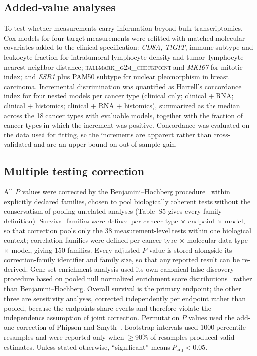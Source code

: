 \subsection{Added-value analyses}
\label{sec:methods:addedvalue}

To test whether measurements carry information beyond bulk transcriptomics, Cox
models for four target measurements were refitted with matched molecular
covariates added to the clinical specification: \textit{CD8A}, \textit{TIGIT},
immune subtype and leukocyte fraction for intratumoral lymphocyte density and
tumor--lymphocyte nearest-neighbor distance;
\textsc{hallmark\_g2m\_checkpoint} and \textit{MKI67} for mitotic index; and
\textit{ESR1} plus PAM50 subtype for nuclear pleomorphism in breast carcinoma.
Incremental discrimination was quantified as Harrell's concordance index for four
nested models per cancer type (clinical only; clinical + RNA; clinical +
histomics; clinical + RNA + histomics), summarized as the median across the 18
cancer types with evaluable models, together with the fraction of cancer types in
which the increment was positive. Concordance was evaluated on the data used for
fitting, so the increments are apparent rather than cross-validated and are an
upper bound on out-of-sample gain.

\subsection{Multiple testing correction}
\label{sec:methods:multiple}

All $P$ values were corrected by the Benjamini--Hochberg
procedure~\cite{benjamini1995} within explicitly declared families, chosen to
pool biologically coherent tests without the conservatism of pooling unrelated
analyses (Table~S5 gives every family definition). Survival
families were defined per cancer type $\times$ endpoint $\times$ model, so that
correction pools only the 38 measurement-level tests within one biological
context; correlation families were defined per cancer type $\times$ molecular
data type $\times$ model, giving 150 families. Every adjusted $P$ value is stored
alongside its correction-family identifier and family size, so that any reported
result can be re-derived. Gene set enrichment analysis used its own canonical
false-discovery procedure based on pooled null normalized enrichment score
distributions~\cite{subramanian2005} rather than Benjamini--Hochberg. Overall
survival is the primary endpoint; the other three are sensitivity analyses,
corrected independently per endpoint rather than pooled, because the endpoints
share events and therefore violate the independence assumption of joint
correction. Permutation $P$ values used the add-one correction of Phipson and
Smyth~\cite{phipson2010permutation}. Bootstrap intervals used \num{1000}
percentile resamples and were reported only when $\geq$90\% of resamples produced
valid estimates. Unless stated otherwise, ``significant'' means
$P_{\mathrm{adj}} < 0.05$.

